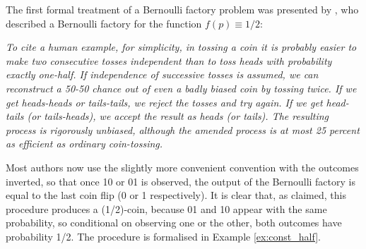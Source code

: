 \documentclass{article}
\theoremstyle{definition}
\begin{document}
The first formal treatment of a Bernoulli factory problem was presented by \citet{vonneumann1951}, who 
described a Bernoulli factory for the function $f(p)\equiv 1/2$:
\begin{displayquote}
\textit{To cite a human example, for simplicity, in tossing a coin it is probably easier to make two consecutive tosses independent than to toss heads with probability exactly one-half. If independence of successive tosses is assumed, we can reconstruct a 50-50 chance out of even a badly biased coin by tossing twice. If we get heads-heads or tails-tails, we reject the tosses and try again. If we get head-tails (or tails-heads), we accept the result as heads (or tails). The resulting process is rigorously unbiased, although the amended process is at most 25 percent as efficient as ordinary coin-tossing.}
\end{displayquote}

Most authors now use the slightly more convenient convention with the outcomes inverted, so that once 10 or 01 is observed, the output of the Bernoulli factory is equal to the last coin flip (0 or 1 respectively). 
It is clear that, as claimed, this procedure produces a (1/2)-coin, because 01 and 10 appear with the same probability, so conditional on observing one or the other, both outcomes have probability 1/2.
The procedure is formalised in Example \ref{ex:const_half}.
\end{document}
